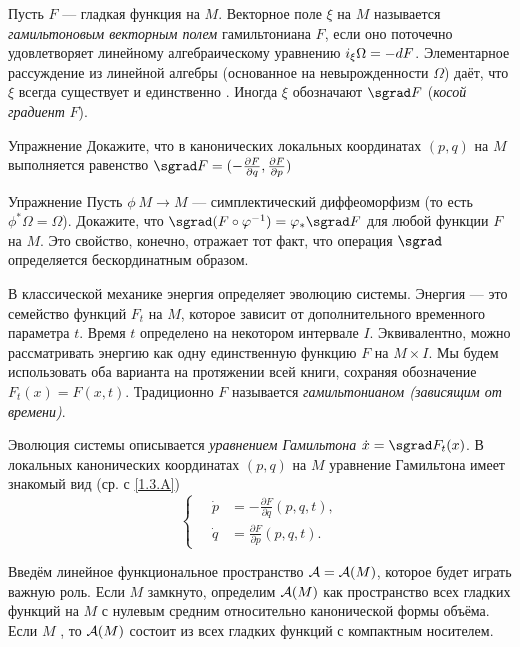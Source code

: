 Пусть $F$ — гладкая функция на $M$.
Векторное поле $\xi$ на $M$ называется \emph{гамильтоновым векторным полем} гамильтониана $F$, если оно поточечно удовлетворяет линейному алгебраическому уравнению $i_\xi \Omega \z= -dF$.
Элементарное рассуждение из линейной алгебры (основанное на невырожденности $\Omega$) даёт, что $\xi$ всегда существует и единственно \cite{MS}.
Иногда $\xi$ обозначают $\sgrad F$ (\emph{косой градиент} $F$).

\begin{ex}{Упражнение}\label{1.3.A}
Докажите, что в канонических локальных координатах $(p, q)$ на
$M$ выполняется равенство \index[symb]{$\sgrad$} $\sgrad F = (-\tfrac{\partial F}{\partial q},\tfrac{\partial F}{\partial p})$
\end{ex}

\begin{ex}{Упражнение}\label{1.3.B}
Пусть  $\phi\: M \to M$ — симплектический диффеоморфизм
(то есть $\phi^\ast \Omega = \Omega$).
Докажите, что $\sgrad (F \circ \phi^{-1}) \z= \phi_\ast \sgrad F$ для любой функции $F$ на $M$.
Это свойство, конечно, отражает тот факт, что операция $\sgrad$ определяется бескординатным образом.
\end{ex}


В классической механике энергия определяет эволюцию системы.
Энергия — это семейство функций $F_t$ на $M$, которое зависит от
дополнительного временного параметра $t$.
Время $t$ определено на некотором интервале $I$.
Эквивалентно, можно рассматривать энергию как одну единственную функцию $F$ на $M \times I$.
Мы будем использовать оба варианта на протяжении всей книги, сохраняя обозначение $F_t (x) = F (x, t)$.
Традиционно $F$ называется \emph{гамильтонианом (зависящим от
  времени)}.

{\sloppy

Эволюция системы описывается \emph{уравнением Гамильтона} $\dot x \z= \sgrad F_t (x)$.
В локальных канонических координатах $(p, q)$ на $M$ уравнение
Гамильтона имеет знакомый вид (ср. с \ref{1.3.A})
\[
\begin{cases}
\quad\dot p &= - \tfrac{\partial F}{\partial q} (p, q, t),\\
\quad\dot q &= \tfrac{\partial F}{\partial p} (p, q, t).
\end{cases}
\]

}

Введём линейное функциональное пространство \index[symb]{$\A$}$\mathcal{A}=\mathcal{A}(M)$, которое будет играть важную роль.
Если $M$ замкнуто, определим $\mathcal{A}(M)$ как пространство всех гладких функций на $M$ с нулевым средним относительно канонической формы объёма.
Если $M$ , то $\mathcal{A}(M)$ состоит из всех гладких функций с компактным носителем.

